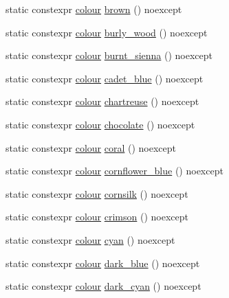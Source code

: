 \begin{DoxyCompactItemize}
static constexpr \mbox{\hyperlink{classmoka_1_1colour}{colour}} \mbox{\hyperlink{classmoka_1_1colour_a0de74dcc468f847e87c04fc8ae30e144}{brown}} () noexcept
\item 
static constexpr \mbox{\hyperlink{classmoka_1_1colour}{colour}} \mbox{\hyperlink{classmoka_1_1colour_a59fe41d1e1b8fc4ff70128b19846b327}{burly\+\_\+wood}} () noexcept
\item 
static constexpr \mbox{\hyperlink{classmoka_1_1colour}{colour}} \mbox{\hyperlink{classmoka_1_1colour_adf150ab92519483a781f5f42e5161284}{burnt\+\_\+sienna}} () noexcept
\item 
static constexpr \mbox{\hyperlink{classmoka_1_1colour}{colour}} \mbox{\hyperlink{classmoka_1_1colour_aa86055bbe26e45c22cd34985d40bb387}{cadet\+\_\+blue}} () noexcept
\item 
static constexpr \mbox{\hyperlink{classmoka_1_1colour}{colour}} \mbox{\hyperlink{classmoka_1_1colour_a98168a4da0885dd4c5c9a227be3474f0}{chartreuse}} () noexcept
\item 
static constexpr \mbox{\hyperlink{classmoka_1_1colour}{colour}} \mbox{\hyperlink{classmoka_1_1colour_af979c0134340a8cc899217613406a7b9}{chocolate}} () noexcept
\item 
static constexpr \mbox{\hyperlink{classmoka_1_1colour}{colour}} \mbox{\hyperlink{classmoka_1_1colour_a12c66d8c9645354719866e301fcaa29b}{coral}} () noexcept
\item 
static constexpr \mbox{\hyperlink{classmoka_1_1colour}{colour}} \mbox{\hyperlink{classmoka_1_1colour_a8a5bb984d5d031bde9c0c7beb1f5cf3a}{cornflower\+\_\+blue}} () noexcept
\item 
static constexpr \mbox{\hyperlink{classmoka_1_1colour}{colour}} \mbox{\hyperlink{classmoka_1_1colour_abf7f389449cbe46d41dea47c7b7fa841}{cornsilk}} () noexcept
\item 
static constexpr \mbox{\hyperlink{classmoka_1_1colour}{colour}} \mbox{\hyperlink{classmoka_1_1colour_a5d1bf668084bbf8bbc7f1f71a9832659}{crimson}} () noexcept
\item 
static constexpr \mbox{\hyperlink{classmoka_1_1colour}{colour}} \mbox{\hyperlink{classmoka_1_1colour_ac079b7ba0870353c46fe83e2f17f9794}{cyan}} () noexcept
\item 
static constexpr \mbox{\hyperlink{classmoka_1_1colour}{colour}} \mbox{\hyperlink{classmoka_1_1colour_a4d323bb1bbdd9fa105f0cb5d02b9461f}{dark\+\_\+blue}} () noexcept
\item 
static constexpr \mbox{\hyperlink{classmoka_1_1colour}{colour}} \mbox{\hyperlink{classmoka_1_1colour_a741a01928dbbfedbcb07a48be38e3ff5}{dark\+\_\+cyan}} () noexcept

\end{DoxyCompactItemize}
